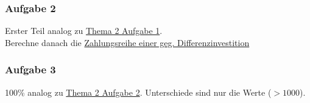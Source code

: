 \documentclass[12pt]{article}
\begin{document}
		\subsubsection*{Aufgabe 2}\label{Thema2Aufgabe2}
		Erster Teil analog zu \hyperref[Thema2Aufgabe1]{Thema 2 Aufgabe 1}. \\
		Berechne danach die \hyperref[ZahlungsreiheEinerDifferenzinvestition]{Zahlungsreihe einer geg. Differenzinvestition}
		\subsubsection*{Aufgabe 3}
		100\% analog zu \hyperref[Thema2Aufgabe2]{Thema 2 Aufgabe 2}. Unterschiede sind nur die Werte ($> 1000$).
		
\end{document}
